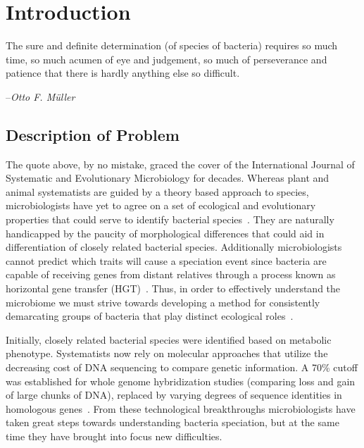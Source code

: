 \chapter{Introduction}
\begin{shadequote}
The sure and definite determination (of species of bacteria) requires so much time, so much acumen of eye and judgement, so much of perseverance and patience that there is hardly anything else so \mbox{difficult}. \par--\emph{Otto F. M\"uller}
\end{shadequote}


\section{Description of Problem}
The quote above, by no mistake, graced the cover of the International Journal of Systematic and Evolutionary Microbiology for decades.
Whereas plant and animal systematists are guided by a theory based approach to  species, microbiologists have yet to agree on a set of ecological and evolutionary properties that could serve to identify bacterial species~\cite{cohan2007systematics}.
They are naturally handicapped by the paucity of morphological differences that could aid in differentiation of closely related bacterial species.
Additionally microbiologists cannot predict which traits will cause a speciation event since bacteria are capable of receiving genes from distant relatives through a process known as horizontal gene transfer (HGT)~\cite{cohan2007systematics}.
Thus, in order to effectively understand the microbiome we must strive towards developing a method for consistently demarcating groups of bacteria that play distinct ecological roles~\cite{koeppel2008identifying}.

Initially, closely related bacterial species were identified based on metabolic phenotype.
Systematists now rely on molecular approaches that utilize the decreasing cost of DNA sequencing to compare genetic information.
A 70\% cutoff was established for whole genome hybridization studies (comparing loss and gain of large chunks of DNA), replaced by varying degrees of sequence identities in homologous genes~\cite{cohan2007systematics,carlo,staley1997biodiversity}.
From these technological breakthroughs microbiologists have taken great steps towards understanding bacteria speciation, but at the same time they have brought into focus new difficulties.

